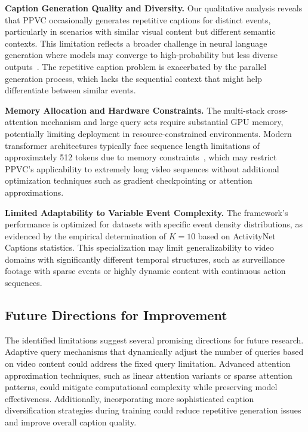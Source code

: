 \textbf{Caption Generation Quality and Diversity.}
Our qualitative analysis reveals that PPVC occasionally generates repetitive captions for distinct events, particularly in scenarios with similar visual content but different semantic contexts.
This limitation reflects a broader challenge in neural language generation where models may converge to high-probability but less diverse outputs~\cite{wang2019describing}.
The repetitive caption problem is exacerbated by the parallel generation process, which lacks the sequential context that might help differentiate between similar events.

\textbf{Memory Allocation and Hardware Constraints.}
The multi-stack cross-attention mechanism and large query sets require substantial GPU memory, potentially limiting deployment in resource-constrained environments.
Modern transformer architectures typically face sequence length limitations of approximately 512 tokens due to memory constraints~\cite{tay2022efficient}, which may restrict PPVC's applicability to extremely long video sequences without additional optimization techniques such as gradient checkpointing or attention approximations.

\textbf{Limited Adaptability to Variable Event Complexity.}
The framework's performance is optimized for datasets with specific event density distributions, as evidenced by the empirical determination of $K=10$ based on ActivityNet Captions statistics.
This specialization may limit generalizability to video domains with significantly different temporal structures, such as surveillance footage with sparse events or highly dynamic content with continuous action sequences.

\subsection{Future Directions for Improvement}
The identified limitations suggest several promising directions for future research. Adaptive query mechanisms that dynamically adjust the number of queries based on video content could address the fixed query limitation. Advanced attention approximation techniques, such as linear attention variants or sparse attention patterns, could mitigate computational complexity while preserving model effectiveness. Additionally, incorporating more sophisticated caption diversification strategies during training could reduce repetitive generation issues and improve overall caption quality.